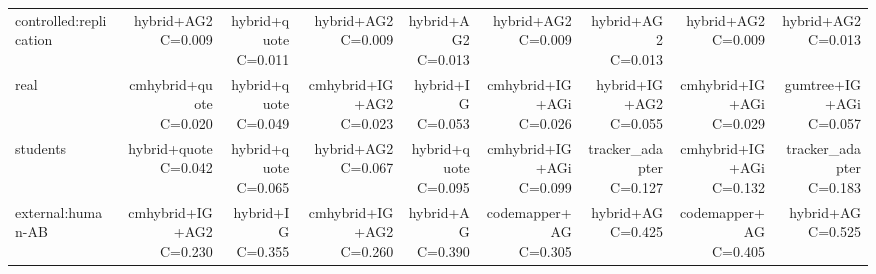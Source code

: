 \begin{table}[t]
{\begin{tabular}{@{}lrrrrrrrr@{}}
controlled:replication & \shortstack{hybrid+AG2\\C=0.009} & \shortstack{hybrid+quote\\C=0.011} & \shortstack{hybrid+AG2\\C=0.009} & \shortstack{hybrid+AG2\\C=0.013} & \shortstack{hybrid+AG2\\C=0.009} & \shortstack{hybrid+AG2\\C=0.013} & \shortstack{hybrid+AG2\\C=0.009} & \shortstack{hybrid+AG2\\C=0.013} \\
real & \shortstack{cmhybrid+quote\\C=0.020} & \shortstack{hybrid+quote\\C=0.049} & \shortstack{cmhybrid+IG+AG2\\C=0.023} & \shortstack{hybrid+IG\\C=0.053} & \shortstack{cmhybrid+IG+AGi\\C=0.026} & \shortstack{hybrid+IG+AG2\\C=0.055} & \shortstack{cmhybrid+IG+AGi\\C=0.029} & \shortstack{gumtree+IG+AGi\\C=0.057} \\
students & \shortstack{hybrid+quote\\C=0.042} & \shortstack{hybrid+quote\\C=0.065} & \shortstack{hybrid+AG2\\C=0.067} & \shortstack{hybrid+quote\\C=0.095} & \shortstack{cmhybrid+IG+AGi\\C=0.099} & \shortstack{tracker\_adapter\\C=0.127} & \shortstack{cmhybrid+IG+AGi\\C=0.132} & \shortstack{tracker\_adapter\\C=0.183} \\
external:human-AB & \shortstack{cmhybrid+IG+AG2\\C=0.230} & \shortstack{hybrid+IG\\C=0.355} & \shortstack{cmhybrid+IG+AG2\\C=0.260} & \shortstack{hybrid+AG\\C=0.390} & \shortstack{codemapper+AG\\C=0.305} & \shortstack{hybrid+AG\\C=0.425} & \shortstack{codemapper+AG\\C=0.405} & \shortstack{hybrid+AG\\C=0.525} \\

\end{tabular}}
\end{table}

